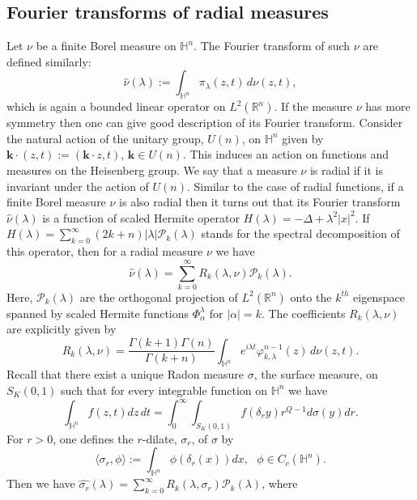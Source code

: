 \documentclass[11pt, reqno]{amsart}
\theoremstyle{plain}
\newcommand{\R}{\ensuremath{\mathbb{R_+}}}
\theoremstyle{remark}
\theoremstyle{example}
\theoremstyle{definition}
\numberwithin{equation}{section}
\def\R{\mathbb{R}}
\def\H{\mathbb{H}}
\def\Ha{\mathbb{H}^n}
\begin{document}
\subsection{ Fourier transforms of radial measures}\label{FT of sigma}
Let $\nu$ be a finite Borel measure on $\Ha$. The Fourier transform of such $\nu$ are defined similarly: 
\begin{equation*}
    \widehat{\nu}(\lambda) := \int_{\Ha} \pi_{\lambda}(z,t) \, d \nu (z ,t),
\end{equation*}
which is again a bounded linear operator on $L^{2}(\R^n)$. If the measure $\nu$ has more symmetry then one can give good description of its Fourier transform. Consider the natural action of the unitary group, $ U(n) $, on $ \Ha $ given by $ \bm{k} \cdot(z,t) := ( \bm{k} \cdot z,t)$, $ \bm{k} \in U(n) $. This induces an action on functions and measures on the Heisenberg group.  We say that a measure $ \nu $ is radial if it is invariant under the action of $ U(n)$. Similar to the case of radial functions, if a finite Borel measure $\nu$ is also radial then it turns out that its Fourier transform  $\hat{\nu}(\lambda)$ is a function of scaled Hermite operator $ H(\lambda) = -\Delta+\lambda^2 |x|^2$. If  $ H(\lambda) = \sum_{k=0}^\infty (2k+n)|\lambda| \mathcal{P}_{k} (\lambda)$  stands for the spectral decomposition of this operator, then for a radial measure $ \nu $ we have
$$ \widehat{\nu}(\lambda)  = \sum_{k=0}^\infty  R_k(\lambda, \nu) \mathcal{P}_{k} (\lambda).$$ 
Here, $\mathcal{P}_{k} (\lambda)$ are the orthogonal projection of $L^2(\mathbb{R}^n)$ onto the $k^{th}$ eigenspace spanned by scaled Hermite functions $\Phi^{\lambda}_{\alpha}$ for $|\alpha|=k$. The coefficients $ R_k(\lambda,\nu) $ are explicitly given by
$$ R_k(\lambda,\nu)  =  \frac{\Gamma(k+1) \Gamma(n)}{\Gamma(k+n)}       \int_{\Ha}  e^{i\lambda t} \varphi_{k,\lambda}^{n-1}(z) \, d\nu(z,t). $$ 
Recall that there exist a unique Radon measure $\sigma$, the surface measure, on $S_{K}(0,1)$ such that for every integrable function on $\H^n$ we have
\begin{equation*}
    \int_{\H^n} f(z,t) dz \, dt = \int_{0}^{\infty} \int_{S_{K}(0,1)} f(\delta_{r} y) r^{Q-1} d \sigma(y) dr.
\end{equation*}
For $r>0$, one defines the $r$-dilate, $\sigma_{r}$, of $\sigma$ by 
\begin{equation*}
    \langle \sigma_{r} , \phi \rangle := \int_{\Ha} \phi(\delta_{r}(x)) dx, \ \ \ \phi \in C_{c}(\Ha).
\end{equation*}
Then we have $ \widehat{\sigma_r}(\lambda)  = \sum_{k=0}^\infty  R_k(\lambda, \sigma_r) \mathcal{P}_{k} (\lambda)$, where 
\end{document}
